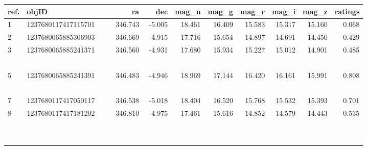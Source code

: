 \documentclass[]{elsarticle} %
\begin{document}
\begin{table}[H]
\centering
\begin{tabular}{l|l|r|r|r|r|r|r|r|r}
\hline
ref. & objID & ra & dec & mag\_u & mag\_g & mag\_r & mag\_i & mag\_z & ratings\\
\hline
1 & 1237680117417115701 & 346.743 & -5.005 & 18.461 & 16.409 & 15.583 & 15.317 & 15.160 & 0.068\\
\hline
2 & 1237680065885306903 & 346.669 & -4.915 & 17.716 & 15.654 & 14.897 & 14.691 & 14.450 & 0.429\\
\hline
3 & 1237680065885241371 & 346.560 & -4.931 & 17.680 & 15.934 & 15.227 & 15.012 & 14.901 & 0.485\\
\hline
\rowcolor[HTML]{D7261E}  \textcolor{white}{\textbf{4}} & \textcolor{white}{\textbf{1237680117417115762}} & \textcolor{white}{\textbf{346.676}} & \textcolor{white}{\textbf{-5.120}} & \textcolor{white}{\textbf{18.920}} & \textcolor{white}{\textbf{17.022}} & \textcolor{white}{\textbf{16.282}} & \textcolor{white}{\textbf{15.974}} & \textcolor{white}{\textbf{15.851}} & \textcolor{white}{\textbf{0.380}}\\
\hline
5 & 1237680065885241391 & 346.483 & -4.946 & 18.969 & 17.144 & 16.420 & 16.161 & 15.991 & 0.808\\
\hline
\rowcolor[HTML]{D7261E}  \textcolor{white}{\textbf{6}} & \textcolor{white}{\textbf{1237680117417050133}} & \textcolor{white}{\textbf{346.594}} & \textcolor{white}{\textbf{-5.161}} & \textcolor{white}{\textbf{16.702}} & \textcolor{white}{\textbf{14.825}} & \textcolor{white}{\textbf{14.068}} & \textcolor{white}{\textbf{13.887}} & \textcolor{white}{\textbf{13.648}} & \textcolor{white}{\textbf{0.241}}\\
\hline
7 & 1237680117417050117 & 346.538 & -5.018 & 18.404 & 16.520 & 15.768 & 15.532 & 15.393 & 0.701\\
\hline
8 & 1237680117417181202 & 346.810 & -4.975 & 17.461 & 15.616 & 14.852 & 14.579 & 14.443 & 0.535\\
\hline
\rowcolor[HTML]{D7261E}  \textcolor{white}{\textbf{9}} & \textcolor{white}{\textbf{1237680117417050120}} & \textcolor{white}{\textbf{346.563}} & \textcolor{white}{\textbf{-5.153}} & \textcolor{white}{\textbf{18.460}} & \textcolor{white}{\textbf{16.498}} & \textcolor{white}{\textbf{15.771}} & \textcolor{white}{\textbf{15.533}} & \textcolor{white}{\textbf{15.397}} & \textcolor{white}{\textbf{0.830}}\\
\hline
\rowcolor[HTML]{D7261E}  \textcolor{white}{\textbf{10}} & \textcolor{white}{\textbf{1237680117417115683}} & \textcolor{white}{\textbf{346.713}} & \textcolor{white}{\textbf{-5.050}} & \textcolor{white}{\textbf{17.585}} & \textcolor{white}{\textbf{15.782}} & \textcolor{white}{\textbf{15.109}} & \textcolor{white}{\textbf{14.867}} & \textcolor{white}{\textbf{14.798}} & \textcolor{white}{\textbf{0.361}}\\

\end{tabular}
\end{table}
\end{document}
